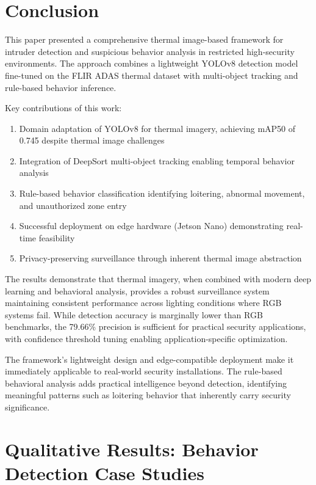 \documentclass[conference]{IEEEtran}
\begin{document}
\section{Conclusion}

This paper presented a comprehensive thermal image-based framework for intruder detection and suspicious behavior analysis in restricted high-security environments. The approach combines a lightweight YOLOv8 detection model fine-tuned on the FLIR ADAS thermal dataset with multi-object tracking and rule-based behavior inference.

Key contributions of this work:
\begin{enumerate}
\item Domain adaptation of YOLOv8 for thermal imagery, achieving mAP50 of 0.745 despite thermal image challenges
\item Integration of DeepSort multi-object tracking enabling temporal behavior analysis
\item Rule-based behavior classification identifying loitering, abnormal movement, and unauthorized zone entry
\item Successful deployment on edge hardware (Jetson Nano) demonstrating real-time feasibility
\item Privacy-preserving surveillance through inherent thermal image abstraction
\end{enumerate}

The results demonstrate that thermal imagery, when combined with modern deep learning and behavioral analysis, provides a robust surveillance system maintaining consistent performance across lighting conditions where RGB systems fail. While detection accuracy is marginally lower than RGB benchmarks, the 79.66\% precision is sufficient for practical security applications, with confidence threshold tuning enabling application-specific optimization.

The framework's lightweight design and edge-compatible deployment make it immediately applicable to real-world security installations. The rule-based behavioral analysis adds practical intelligence beyond detection, identifying meaningful patterns such as loitering behavior that inherently carry security significance.

\section{Qualitative Results: Behavior Detection Case Studies}
\end{document}
